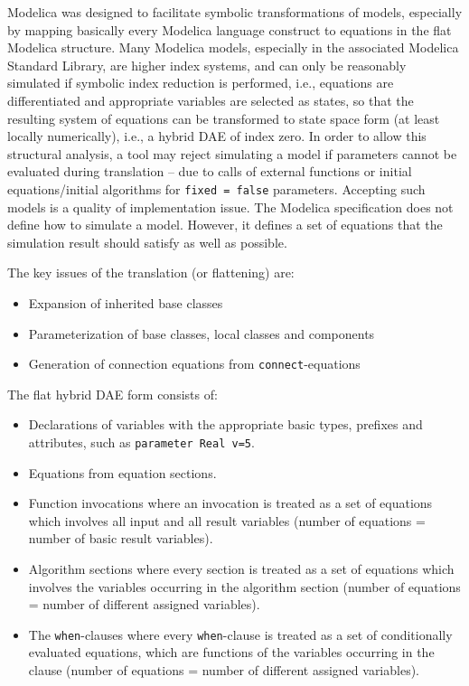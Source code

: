 Modelica was designed to facilitate symbolic transformations of models, especially by mapping basically every Modelica language construct to equations in the flat Modelica structure.
Many Modelica models, especially in the associated Modelica Standard Library, are higher index systems, and can only be reasonably simulated if symbolic index reduction is performed, i.e., equations are differentiated and appropriate variables are selected as states, so that the resulting system of equations can be transformed to state space form (at least locally numerically), i.e., a hybrid DAE of index zero.
In order to allow this structural analysis, a tool may reject simulating a model if parameters cannot be evaluated during translation -- due to calls of external functions or initial equations/initial algorithms for \lstinline!fixed = false! parameters.
Accepting such models is a quality of implementation issue.
The Modelica specification does not define how to simulate a model.
However, it defines a set of equations that the simulation result should satisfy as well as possible.

The key issues of the translation (or flattening) are:
\begin{itemize}
\item
  Expansion of inherited base classes
\item
  Parameterization of base classes, local classes and components
\item
  Generation of connection equations from \lstinline!connect!-equations
\end{itemize}

The flat hybrid DAE form consists of:
\begin{itemize}
\item
  Declarations of variables with the appropriate basic types, prefixes
  and attributes, such as \lstinline!parameter Real v=5!.
\item
  Equations from equation sections.
\item
  Function invocations where an invocation is treated as a set of
  equations which involves all input and all result variables (number of
  equations = number of basic result variables).
\item
  Algorithm sections where every section is treated as a set of
  equations which involves the variables occurring in the algorithm
  section (number of equations = number of different assigned
  variables).
\item
  The \lstinline!when!-clauses where every \lstinline!when!-clause is treated as a set of conditionally evaluated equations, which are functions of the variables occurring in the clause (number of equations = number of different assigned variables).
\end{itemize}

